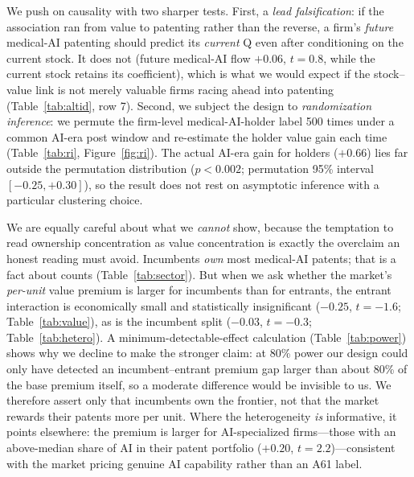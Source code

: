\documentclass[12pt]{article}
\begin{document}
We push on causality with two sharper tests. First, a \emph{lead falsification}: if the
association ran from value to patenting rather than the reverse, a firm's \emph{future} medical-AI
patenting should predict its \emph{current} Q even after conditioning on the current stock. It
does not (future medical-AI flow $+0.06$, $t=0.8$, while the current stock retains its
coefficient), which is what we would expect if the stock--value link is not merely valuable firms
racing ahead into patenting (Table~\ref{tab:altid}, row 7). Second, we subject the design to
\emph{randomization inference}: we permute the firm-level medical-AI-holder label 500 times under
a common AI-era post window and re-estimate the holder value gain each time
(Table~\ref{tab:ri}, Figure~\ref{fig:ri}). The actual AI-era gain for holders ($+0.66$) lies far
outside the permutation distribution ($p<0.002$; permutation 95\% interval $[-0.25,+0.30]$), so
the result does not rest on asymptotic inference with a particular clustering choice.

We are equally careful about what we \emph{cannot} show, because the temptation to read
ownership concentration as value concentration is exactly the overclaim an honest reading must
avoid. Incumbents \emph{own} most medical-AI patents; that is a fact about counts
(Table~\ref{tab:sector}). But when we ask whether the market's \emph{per-unit} value premium is
larger for incumbents than for entrants, the entrant interaction is economically small and
statistically insignificant ($-0.25$, $t=-1.6$; Table~\ref{tab:value}), as is the incumbent split
($-0.03$, $t=-0.3$; Table~\ref{tab:hetero}). A minimum-detectable-effect
calculation (Table~\ref{tab:power}) shows why we decline to make the stronger claim: at 80\% power
our design could only have detected an incumbent--entrant premium gap larger than about 80\% of the
base premium itself, so a moderate difference would be invisible to us. We therefore assert only
that incumbents own the frontier, not that the market rewards their patents more per unit. Where
the heterogeneity \emph{is} informative, it points elsewhere: the premium is larger for
AI-specialized firms---those with an above-median share of AI in their patent portfolio ($+0.20$,
$t=2.2$)---consistent with the market pricing genuine AI capability rather than an A61 label.
\end{document}
